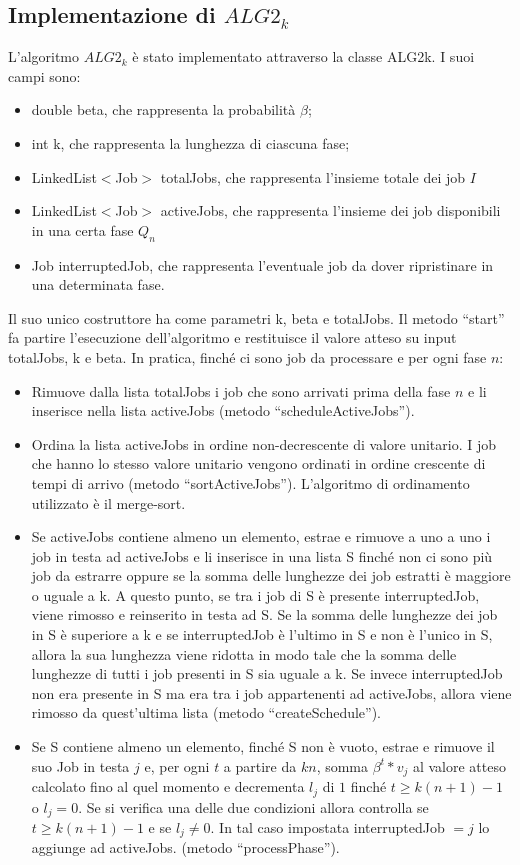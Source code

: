 \documentclass[12pt]{article}
\begin{document}
\subsection{Implementazione di $ALG2_{k}$}
L’algoritmo $ALG2_{k}$ è stato implementato attraverso la classe ALG2k. I suoi campi sono:
\begin{itemize}
\item{double beta, che rappresenta la probabilità $\beta$;}
\item{int k, che rappresenta la lunghezza di ciascuna fase;}
\item{LinkedList$<$Job$>$ totalJobs, che rappresenta l’insieme totale dei job $I$}
\item{LinkedList$<$Job$>$ activeJobs, che rappresenta l’insieme dei job disponibili in una certa fase $Q_{n}$}
\item{Job interruptedJob, che rappresenta l’eventuale job da dover ripristinare in una determinata fase.}
\end{itemize}
Il suo unico costruttore ha come parametri k, beta e totalJobs. Il metodo “start” fa partire l’esecuzione dell’algoritmo e restituisce il valore atteso su input totalJobs, k e beta. In pratica, finché ci sono job da processare e per ogni fase $n$:
\begin{itemize}
\item{Rimuove dalla lista totalJobs i job che sono arrivati prima della fase $n$ e li inserisce nella lista activeJobs (metodo “scheduleActiveJobs”).}
\item{Ordina la lista activeJobs in ordine non-decrescente di valore unitario. I job che hanno lo stesso valore unitario  vengono ordinati in ordine crescente di tempi di arrivo (metodo “sortActiveJobs”). L’algoritmo di ordinamento utilizzato è il merge-sort.}
\item{Se activeJobs contiene almeno un elemento, estrae e rimuove a uno a uno i job in testa ad activeJobs e li inserisce in una lista S finché non ci sono più job da estrarre oppure se la somma delle lunghezze dei job estratti è maggiore o uguale a k. A questo punto, se tra i job di S è presente interruptedJob, viene rimosso e reinserito in testa ad S. Se la somma delle lunghezze dei job in S è superiore a k e se interruptedJob è l’ultimo in S e non è l’unico in S, allora la sua lunghezza viene ridotta in modo tale che la somma delle lunghezze di tutti i job presenti in S sia uguale a k. Se invece interruptedJob non era presente in S ma era tra i job appartenenti ad activeJobs, allora viene rimosso da quest’ultima lista (metodo “createSchedule”).}
\item{Se S contiene almeno un elemento, finché S non è vuoto, estrae e rimuove il suo Job in testa $j$  e, per ogni $t$ a partire da $kn$, somma $\beta^{t} * v_{j}$ al valore atteso calcolato fino al quel momento e decrementa $l_{j}$ di $1$ finché $t \geq k(n + 1) - 1$ o $l_{j} = 0$. Se si verifica una delle due condizioni allora controlla se $t \geq k(n + 1) - 1$ e se  $l_{j} \neq 0$. In tal caso impostata interruptedJob $= j$ lo aggiunge ad activeJobs. (metodo “processPhase”).}
\end{itemize}
\end{document}
